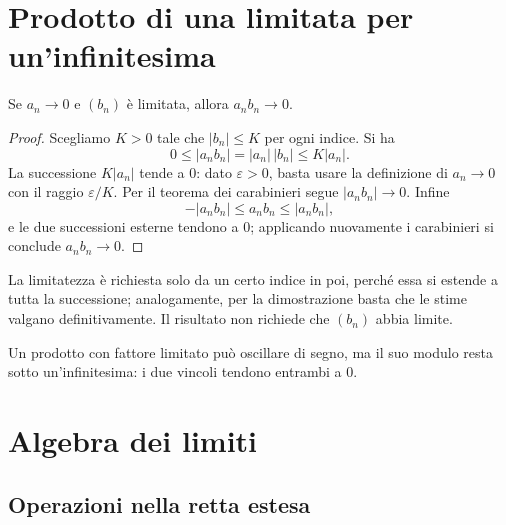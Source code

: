 \section{Prodotto di una limitata per un'infinitesima}

\begin{proposizione}
\label{prop:limitata-infinitesima}
Se $a_n\to0$ e $(b_n)$ è limitata, allora $a_nb_n\to0$.
\end{proposizione}
\begin{proof}
Scegliamo $K>0$ tale che $|b_n|\le K$ per ogni indice. Si ha
\[
0\le|a_nb_n|=|a_n|\,|b_n|\le K|a_n|.
\]
La successione $K|a_n|$ tende a $0$: dato $\varepsilon>0$, basta usare la definizione di $a_n\to0$ con il raggio $\varepsilon/K$. Per il teorema dei carabinieri segue $|a_nb_n|\to0$. Infine
\[
-|a_nb_n|\le a_nb_n\le|a_nb_n|,
\]
e le due successioni esterne tendono a $0$; applicando nuovamente i carabinieri si conclude $a_nb_n\to0$.
\end{proof}

La limitatezza è richiesta solo da un certo indice in poi, perché essa si estende a tutta la successione; analogamente, per la dimostrazione basta che le stime valgano definitivamente. Il risultato non richiede che $(b_n)$ abbia limite.

\begin{schema}
\par\smallskip Un prodotto con fattore limitato può oscillare di segno, ma il suo modulo resta sotto un'infinitesima: i due vincoli tendono entrambi a $0$.
\end{schema}

\section{Algebra dei limiti}

\subsection{Operazioni nella retta estesa}

